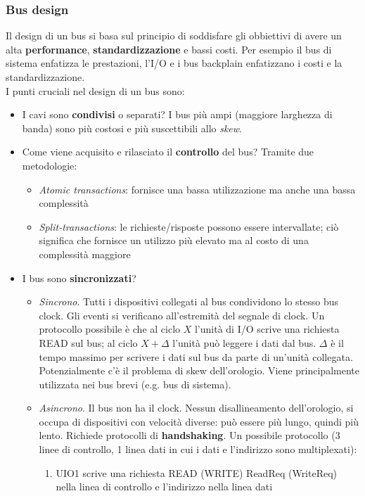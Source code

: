 \subsubsection{Bus design}
Il design di un bus si basa sul principio di soddisfare gli obbiettivi di avere un alta \textbf{performance}, \textbf{standardizzazione} e bassi costi. Per esempio 
il bus di sistema enfatizza le prestazioni, l'I/O e i bus backplain enfatizzano i costi e la standardizzazione.\\
I punti cruciali nel design di un bus sono:
\begin{itemize}
    \item I cavi sono \textbf{condivisi} o separati? I bus più ampi (maggiore larghezza di banda) sono più costosi e più suscettibili allo \emph{skew}.
    \item Come viene acquisito e rilasciato il \textbf{controllo} del bus? Tramite due metodologie:
    \begin{itemize}
    	\item  \emph{Atomic transactions}: fornisce una bassa utilizzazione ma anche una bassa complessità
    	\item \emph{Split-transactions}: le richieste/risposte possono essere intervallate; ciò significa che fornisce un utilizzo più elevato ma al costo di una complessità maggiore
    \end{itemize}
    \item I bus sono \textbf{sincronizzati}?
    \begin{itemize}
        \item \emph{Sincrono}. Tutti i dispositivi collegati al bus condividono lo stesso bus clock. Gli eventi si verificano all'estremità del segnale di clock. Un protocollo possibile è che al ciclo \(X\) l'unità di I/O scrive una richiesta READ sul bus; al ciclo \(X + \Delta\) l'unità può leggere i dati dal bus.
        \(\Delta\) è il tempo massimo per scrivere i dati sul bus da parte di un'unità collegata. Potenzialmente c'è il problema di skew dell'orologio. Viene principalmente utilizzata nei bus brevi (e.g. bus di sistema).
        \item \emph{Asincrono}. Il bus non ha il clock. Nessun disallineamento dell'orologio, si occupa di dispositivi con velocità diverse: può essere più lungo, quindi più lento. Richiede protocolli di \textbf{handshaking}. Un possibile protocollo (3 linee di controllo, 1 linea dati in cui i dati e l'indirizzo sono multiplexati):
        \begin{enumerate}
        	\item UIO1 scrive una richiesta READ (WRITE) ReadReq (WriteReq) nella linea di controllo e l'indirizzo nella linea dati

\end{enumerate}
\end{itemize}
\end{itemize}
